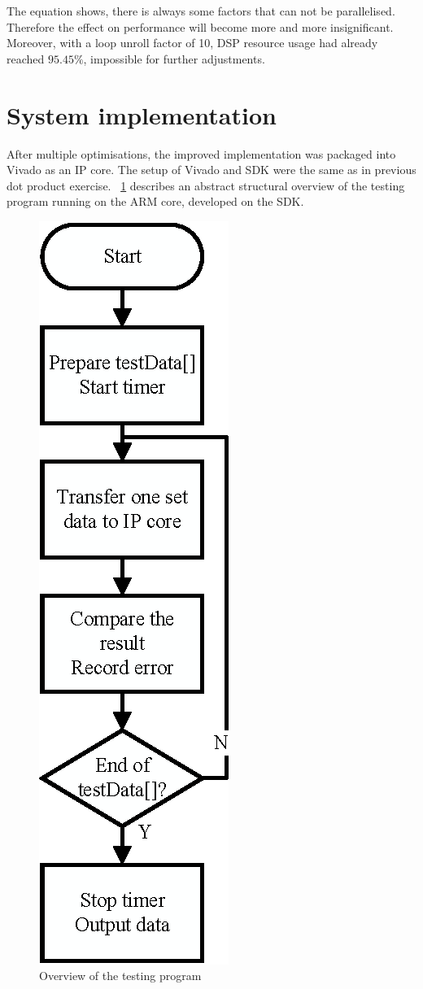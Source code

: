 \documentclass[journal]{IEEEtran}
\newcommand{\fref}[1]{\figurename~\ref{#1}}
\newcommand{\improvi}[1]{\improv[inline]{#1}}
\begin{document}
The equation shows, there is always some factors that can not be parallelised. Therefore the effect on performance will become more and more insignificant. Moreover, with a loop unroll factor of 10, DSP resource usage had already reached $95.45 \%$, impossible for further adjustments.

\improvi{More?}

\section{System implementation}

After multiple optimisations, the improved implementation was packaged into Vivado as an IP core. The setup of Vivado and SDK were the same as in previous dot product exercise. \fref{fig:sdk} describes an abstract structural overview of the testing program running on the ARM core, developed on the SDK.

\begin{figure}[t]
	\centering
	\includegraphics[width=0.3\columnwidth]{sdk}
	\caption{Overview of the testing program}
	\label{fig:sdk}
\end{figure}
\end{document}
